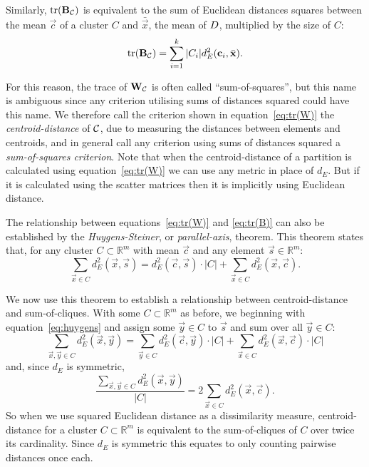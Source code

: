 Similarly, $\operatorname*{tr}(\mathbf{B_{\mathcal{C}}})$ is equivalent to the sum of Euclidean
distances squares between the mean $\vec{c}$ of a cluster $C$ and
$\bar{\vec{x}}$, the mean of $D$, multiplied by the size of $C$:
\begin{equation}
  \label{eq:tr(B)}
  \operatorname*{tr}(\mathbf{B_{\mathcal{C}}}) = \sum_{i=1}^{k} |C_i| d_E^2(\mathbf{c}_i,\bar{\mathbf{x}}).
\end{equation}

For this reason, the trace of $\mathbf{W}_{\mathcal{C}}$ is often called
``sum-of-squares'', but this name is ambiguous since any criterion utilising
sums of distances squared could have this name.  We therefore call the
criterion shown in equation~\eqref{eq:tr(W)} the \textit{centroid-distance} of
$\mathcal{C}$, due to measuring the distances between elements and centroids, and in
general call any criterion using sums of distances squared a
\textit{sum-of-squares criterion}.  Note that when the centroid-distance of a
partition is calculated using equation~\eqref{eq:tr(W)} we can use any metric
in place of $d_{E}$.  But if it is calculated using the scatter matrices then
it is implicitly using Euclidean distance.

The relationship between equations~\eqref{eq:tr(W)} and \eqref{eq:tr(B)} can
also be established by the \textit{Huygens-Steiner}, or
\textit{parallel-axis}, theorem.  This theorem states that, for any cluster $C
\subset \mathbb{R}^m$ with mean $\vec{c}$ and any element $\vec{s} \in
\mathbb{R}^m$:
\begin{equation}
  \label{eq:huygens}
  \sum_{\vec{x} \in C} d_E^2(\vec{x},\vec{s}) = d_E^2(\vec{c},\vec{s}) \cdot |C| +
                             \sum_{\vec{x} \in C} d_E^2(\vec{x},\vec{c}).
\end{equation}

We now use this theorem to establish a relationship between centroid-distance
and sum-of-cliques.  With some $C \subset \mathbb{R}^m$ as before, we
beginning with equation~\eqref{eq:huygens} and assign some $\vec{y} \in C$ to
$\vec{s}$ and sum over all $\vec{y} \in C$:
\begin{equation*}
  \sum_{\vec{x},\vec{y} \in C} d_E^2(\vec{x},\vec{y}) = \sum_{\vec{y} \in C}
  d_E^2(\vec{c},\vec{y}) \cdot |C| 
  + \sum_{\vec{x} \in C} d_E^2(\vec{x},\vec{c}) \cdot |C|
\end{equation*}
and, since $d_E$ is symmetric,
\begin{equation}
  \label{eq:cd-as-equivalence}
  \frac{\displaystyle \sum_{\vec{x},\vec{y} \in C} d_E^2(\vec{x},\vec{y})}
       {|C|}
  = 2 \sum_{\vec{x} \in C} d_E^2(\vec{x},\vec{c}).
\end{equation}
So when we use squared Euclidean distance as a dissimilarity measure,
centroid-distance for a cluster $C \subset \mathbb{R}^m$ is equivalent to the
sum-of-cliques of $C$ over twice its cardinality.  Since $d_E$ is symmetric
this equates to only counting pairwise distances once each.

